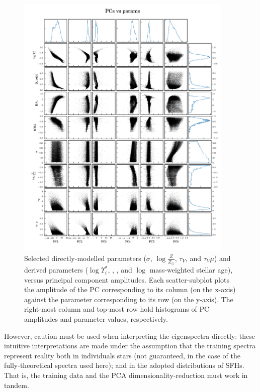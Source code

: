 \begin{figure}
    \centering
    \includegraphics[height=0.925\textheight, width=0.925\textwidth, keepaspectratio]{PCs_params_FSPS}
    \caption[Principal component amplitudes versus SFH properties of interest]{\fixspacing Selected directly-modelled parameters ($\sigma$, $\log \frac{Z}{Z_{\odot}}$, $\tau_V$, and $\tau_V \mu$) and derived parameters ($\log \Upsilon^*_i$, \Dn, \HdeltaA, and $\log$ mass-weighted stellar age), versus principal component amplitudes. Each scatter-subplot plots the amplitude of the PC corresponding to its column (on the x-axis) against the parameter corresponding to its row (on the y-axis). The right-most column and top-most row hold histograms of PC amplitudes and parameter values, respectively.}
    \label{fig:PCs_vs_params}
\end{figure}

However, caution must be used when interpreting the eigenspectra directly: these intuitive interpretations are made under the assumption that the training spectra represent reality both in individuals stars (not guaranteed, in the case of the fully-theoretical spectra used here); and in the adopted distributions of SFHs. That is, the training data and the PCA dimensionality-reduction must work in tandem.

